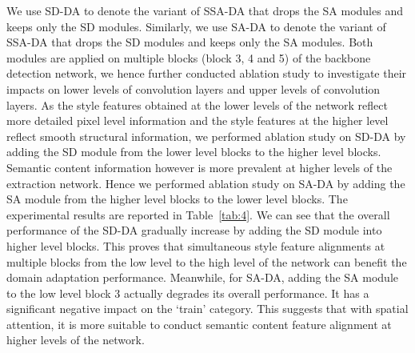 \documentclass[runningheads]{llncs}
\begin{document}
We use SD-DA to denote the variant of SSA-DA 
that drops the SA modules and keeps only the SD modules. 
Similarly, we use SA-DA to denote the variant of SSA-DA
that drops the SD modules and keeps only the SA modules. 
Both modules are applied on multiple blocks (block 3, 4 and 5) of the backbone detection network,
we hence further conducted ablation study to investigate their impacts on lower levels of convolution layers
and upper levels of convolution layers. 
As the style features obtained at the lower levels of the network reflect more detailed pixel level information
and the style features at the higher level reflect smooth structural information, 
we performed ablation study on SD-DA by adding the SD module from the lower level blocks to the higher level blocks. 
Semantic content information however is more prevalent at higher levels of the extraction network. 
Hence we performed ablation study on SA-DA by adding the SA module from the higher level blocks to the lower level blocks.
The experimental results are reported in Table~\ref{tab:4}. 
We can see that the overall performance of the SD-DA gradually increase by adding the SD module into higher level blocks. 
This proves that 
simultaneous style feature alignments at multiple blocks from the low level to the high level of the network
can benefit the domain adaptation performance. 
Meanwhile, for SA-DA, adding the SA module to the low level block 3 actually degrades its overall performance.
It has a significant negative impact on the `train' category.
This suggests that with spatial attention, it is more suitable to conduct semantic content feature alignment at higher levels of the network.
\\
\end{document}
